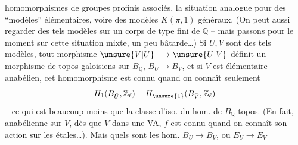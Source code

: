 homomorphismes de groupes profinis associés,   la situation analogue pour des ``modèles'' élémentaires, voire des modèles $K(\pi,1)$ généraux. (On peut aussi regarder des tels modèles sur un corps   de type fini de $\mathbb{Q}$ -- mais passons pour le moment sur cette situation mixte, un peu bâtarde\ldots) Si $U,V$ sont des tels modèles, tout morphisme $\unsure{V|U}\longrightarrow\unsure{U|V}$ définit un morphisme de topos galoisiens sur $B_{\mathbb{Q}}$, $B_U\longrightarrow B_V$,  et si $V$ est  élémentaire anabélien, cet homomorphisme est connu quand on connaît seulement
\[
H_1(B_{\bar U},\mathbb{Z}_{\ell})-H_{\unsure{1}}(B_{\bar V},\mathbb{Z}_{\ell})
\]
-- ce qui est beaucoup moins que la classe d'iso. du hom. de $B_{\mathbb{Q}}$-topos. (En fait,   anabélienne sur $V$, dès que $V$  dans une VA, $f$ est connu quand on connaît son action sur les  étales\ldots). Mais quels sont les hom. $B_U\longrightarrow B_V$, ou $E_U\longrightarrow E_V$
